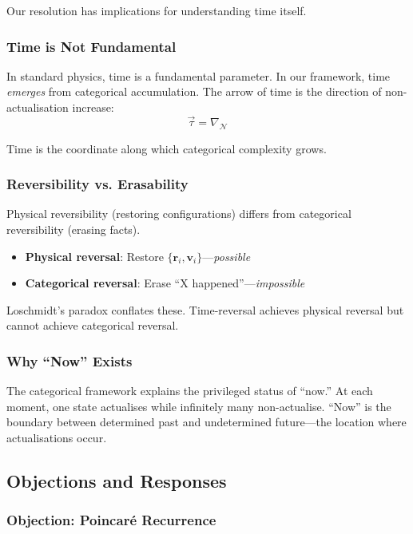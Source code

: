 \documentclass[twocolumn,10pt]{article}
\theoremstyle{definition}
\theoremstyle{remark}
\begin{document}
Our resolution has implications for understanding time itself.

\subsubsection{Time is Not Fundamental}

In standard physics, time is a fundamental parameter. In our framework, time \textit{emerges} from categorical accumulation. The arrow of time is the direction of non-actualisation increase:
\begin{equation}
\vec{\tau} = \nabla_{\mathcal{N}}
\end{equation}

Time is the coordinate along which categorical complexity grows.

\subsubsection{Reversibility vs. Erasability}

Physical reversibility (restoring configurations) differs from categorical reversibility (erasing facts).

\begin{itemize}
\item \textbf{Physical reversal}: Restore $\{\mathbf{r}_i, \mathbf{v}_i\}$---\textit{possible}
\item \textbf{Categorical reversal}: Erase ``X happened''---\textit{impossible}
\end{itemize}

Loschmidt's paradox conflates these. Time-reversal achieves physical reversal but cannot achieve categorical reversal.

\subsubsection{Why ``Now'' Exists}

The categorical framework explains the privileged status of ``now.'' At each moment, one state actualises while infinitely many non-actualise. ``Now'' is the boundary between determined past and undetermined future---the location where actualisations occur.

\subsection{Objections and Responses}

\subsubsection{Objection: Poincaré Recurrence}
\end{document}
